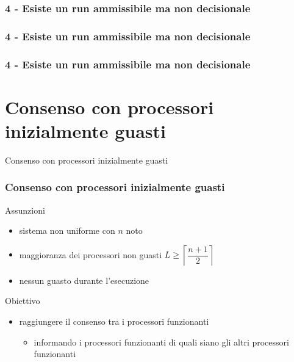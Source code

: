 \documentclass{beamer}
\begin{document}
\begin{frame}\frametitle{4 - Esiste un run ammissibile ma non decisionale}
\begin{figure}\centering\end{figure}
\begin{center}\color{white}{$C_\beta$ bivalente}\end{center}
\end{frame}

\begin{frame}\frametitle{4 - Esiste un run ammissibile ma non decisionale}
\begin{figure}\centering\end{figure}
\begin{center}\color{white}{$C_\beta$ bivalente}\end{center}
\end{frame}

\begin{frame}\frametitle{4 - Esiste un run ammissibile ma non decisionale}
\begin{figure}\centering\end{figure}
\begin{center}\color{white}{$C_\beta$ bivalente}\end{center}
\end{frame}


\section{Consenso con processori inizialmente guasti}
\begin{frame}{}\begin{block}{}\centering\LARGE Consenso con processori inizialmente guasti\end{block}\vspace{0.5cm}\end{frame}

\begin{frame}\frametitle{Consenso con processori inizialmente guasti}
Assunzioni
\begin{itemize}
\item sistema non uniforme con $n$ noto
\item maggioranza dei processori non guasti $L\geq\left\lceil\dfrac{n+1}{2}\right\rceil$
\item nessun guasto durante l'esecuzione
\end{itemize}
Obiettivo
\begin{itemize}
\item raggiungere il consenso tra i processori funzionanti
\begin{itemize}
\item informando i processori funzionanti di quali siano gli altri processori funzionanti
\end{itemize}
\end{itemize}
\end{frame}
\end{document}
